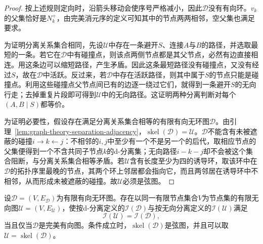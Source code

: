 \begin{proof}
按上述规则定向时，沿箭头移动会使序号严格减小，因此$\mathcal{D}$没有有向环。$v_k$的父集恰好是$N_k^+$，由完美消元序的定义可知其中的节点两两相邻，空父集也满足要求。

为证明分离关系集合相同，先设$\mathcal{U}$中存在一条避开$S$、连接$A$与$B$的路径，并选取最短的一条。若它在$\mathcal{D}$中有碰撞点，则该点两侧节点都是其父节点，必然有边直接相连。用这条边可以缩短路径，产生矛盾。因此这条最短路径没有碰撞点，又没有经过$S$，故在$\mathcal{D}$中活跃。反过来，若$\mathcal{D}$中存在活跃路径，则其中属于$S$的节点只能是碰撞点。利用这些碰撞点父节点间已有的边逐一绕过它们，就得到一条避开$S$的无向行走；去掉重复片段即可得到$\mathcal{U}$中的无向路径。这证明两种分离判断对每个$(A,B\mid S)$都等价。

为证明必要性，假设存在满足分离关系集合相等的有限有向无环图$\mathcal{D}$。由引理~\ref{lem:graph-theory-separation-adjacency}，$\operatorname{skel}(\mathcal{D})=\mathcal{U}$。$\mathcal{D}$不能含有未被遮蔽的碰撞$i\to k\leftarrow j$：不相邻的$i,j$中至少有一个不是另一个的后代，取相应节点的父集便得到一个不含共同子节点$k$的d-分离集；无向路径$i-k-j$却不会被这个集合阻断，与分离关系集合相等矛盾。若$\mathcal{U}$含有长度至少为四的诱导环，取该环中在$\mathcal{D}$的拓扑序里最晚的节点，其两个环上邻居都会指向它，而且两邻居在诱导环中不相邻，从而形成未被遮蔽的碰撞。故$\mathcal{U}$必须是弦图。
\end{proof}

\begin{theorem}[有向图的完美无向图表示]
  \label{thm:graph-theory-perfect-undirected}
  设$\mathcal{D}=(V,E_{\mathcal D})$为有限有向无环图。存在以同一有限节点集合$V$为节点集的有限无向图$\mathcal{U}=(V,E_{\mathcal U})$，使按d-分离定义的$\mathcal{I}(\mathcal{D})$与按无向分离定义的$\mathcal{I}(\mathcal{U})$满足
  \[
    \mathcal{I}(\mathcal{U})=\mathcal{I}(\mathcal{D}),
  \]
  当且仅当$\mathcal{D}$是完美有向图。条件成立时，$\operatorname{skel}(\mathcal{D})$是弦图，并且可以取$\mathcal{U}=\operatorname{skel}(\mathcal{D})$。
\end{theorem}

